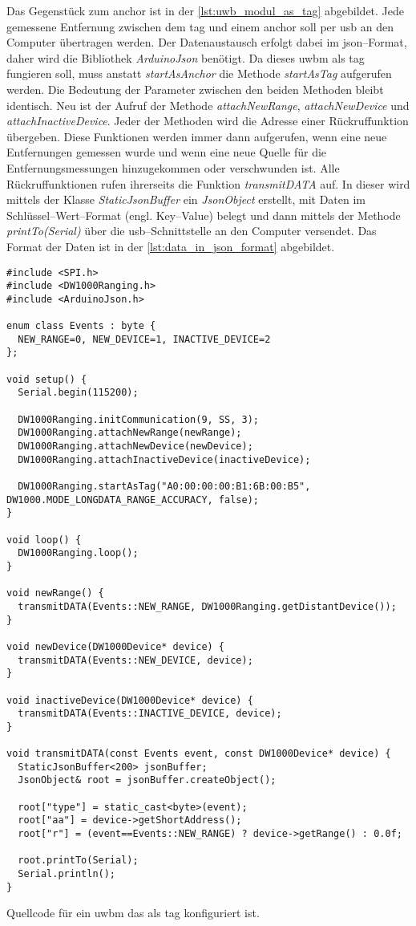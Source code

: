 Das Gegenstück zum \Gls{anchor} ist in der \autoref{lst:uwb_modul_as_tag} abgebildet. Jede gemessene Entfernung zwischen dem \Gls{tag} und einem \Gls{anchor} soll per \Gls{usb} an den Computer übertragen werden. Der Datenaustausch erfolgt dabei im \Gls{json}--Format, daher wird die Bibliothek \textit{ArduinoJson} benötigt.
Da dieses \Gls{uwbm} als \Gls{tag} fungieren soll, muss anstatt \textit{startAsAnchor} die Methode \textit{startAsTag} aufgerufen werden. Die Bedeutung der Parameter zwischen den beiden Methoden bleibt identisch.
Neu ist der Aufruf der Methode \textit{attachNewRange}, \textit{attachNewDevice} und \textit{attachInactiveDevice}. Jeder der Methoden wird die Adresse einer Rückruffunktion übergeben. Diese Funktionen werden immer dann aufgerufen, wenn eine neue Entfernungen gemessen wurde und wenn eine neue Quelle für die Entfernungsmessungen hinzugekommen oder verschwunden ist.
Alle Rückruffunktionen rufen ihrerseits die Funktion \textit{transmitDATA} auf. In dieser wird mittels der Klasse \textit{StaticJsonBuffer} ein \textit{JsonObject} erstellt, mit Daten im Schlüssel--Wert--Format (engl. Key--Value) belegt und dann mittels der Methode \textit{printTo(Serial)} über die \Gls{usb}--Schnittstelle an den Computer versendet. Das Format der Daten ist in der \autoref{lst:data_in_json_format} abgebildet.

\begin{listing}
	\begin{verbatim}
#include <SPI.h>
#include <DW1000Ranging.h>
#include <ArduinoJson.h>

enum class Events : byte {
  NEW_RANGE=0, NEW_DEVICE=1, INACTIVE_DEVICE=2
};

void setup() {
  Serial.begin(115200);
  
  DW1000Ranging.initCommunication(9, SS, 3);
  DW1000Ranging.attachNewRange(newRange);
  DW1000Ranging.attachNewDevice(newDevice);
  DW1000Ranging.attachInactiveDevice(inactiveDevice);

  DW1000Ranging.startAsTag("A0:00:00:00:B1:6B:00:B5", DW1000.MODE_LONGDATA_RANGE_ACCURACY, false);
}

void loop() {
  DW1000Ranging.loop();
}

void newRange() {
  transmitDATA(Events::NEW_RANGE, DW1000Ranging.getDistantDevice());
}

void newDevice(DW1000Device* device) {
  transmitDATA(Events::NEW_DEVICE, device);
}

void inactiveDevice(DW1000Device* device) {
  transmitDATA(Events::INACTIVE_DEVICE, device);
}

void transmitDATA(const Events event, const DW1000Device* device) {
  StaticJsonBuffer<200> jsonBuffer;
  JsonObject& root = jsonBuffer.createObject();

  root["type"] = static_cast<byte>(event);
  root["aa"] = device->getShortAddress();
  root["r"] = (event==Events::NEW_RANGE) ? device->getRange() : 0.0f;
  
  root.printTo(Serial);
  Serial.println();
}
	\end{verbatim}
	\unskip
	\caption{Quellcode für ein \Gls{uwbm} das als \Gls{tag} konfiguriert ist.}
	\label{lst:uwb_modul_as_tag}
\end{listing}


